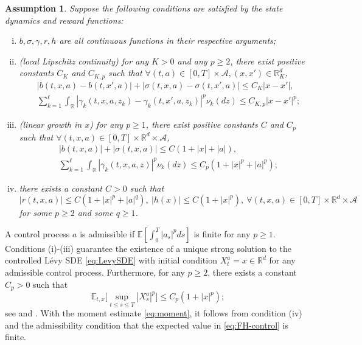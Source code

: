 \documentclass[11pt]{article}
\newtheorem{assumption}{Assumption}
\newcommand{\1}{\mathbbm{1}}
\begin{document}
\begin{assumption}\label{assump:SDE}
Suppose the following conditions are satisfied by the state dynamics and reward functions:
\begin{enumerate}[(i)]
	\item $b, \sigma, \gamma, r, h$ are all continuous functions in their respective arguments;
	
	\item (local Lipschitz continuity) for any $K>0$ and any $p\geq 2$, there exist positive constants $C_K$ and $C_{K,p}$ such that $\forall(t, a) \in[0, T] \times \mathcal{A}, (x,x')\in\mathbb{R}^d_K$,
	\begin{align}
		&|b(t,x,a)-b(t,x',a)|+|\sigma(t,x,a)-\sigma(t,x',a)|\le C_K|x-x'|,\\
		&\sum_{k=1}^\ell \int_{\mathbb{R}}|\gamma_k(t,x,a,z_k)-\gamma_k(t,x',a,z_k)|^p\nu_k(dz)\le C_{K,p}|x-x'|^p;
	\end{align}
	
	\item (linear growth in $x$) for any $p\geq 1$, there exist positive constants $C$ and $C_p$ such that $\forall(t, x, a) \in[0, T] \times \mathbb{R}^d \times \mathcal{A}$,
	\begin{align}
		&|b(t,x,a)|+|\sigma(t,x,a)|\le C(1+|x|+{|a|}),\\
		&\sum_{k=1}^\ell \int_{\mathbb{R}}|\gamma_k(t,x,a,z)|^p\nu_k(dz)\le C_p(1+|x|^p+{|a|^p});
	\end{align}

	\item there exists a constant $C>0$ such that
	\begin{equation}
		|r(t, x, a)| \le C\left(1+|x|^{p}+|a|^{q}\right), \ |h(x)| \le C\left(1+|x|^{p}\right),\ \forall(t, x, a) \in[0, T] \times \mathbb{R}^d \times \mathcal{A}
	\end{equation}
	for some $p\ge 2$ and some $q\ge 1$.
\end{enumerate}
\end{assumption}

A control process $a$ is admissible if $\mathbb{E}[\int_0^T|a_s|^{p} ds]$ is finite for any $p\geq 1$. Conditions (i)-(iii) guarantee the existence of a unique strong solution to the controlled L\'evy SDE \eqref{eq:LevySDE} with initial condition $X_t^a=x\in\mathbb{R}^d$ for any admissible control process. Furthermore, for any $p\ge 2$, there exists a constant $C_p>0$ such that
\begin{equation}\label{eq:moment}
	\mathbb{E}_{t,x}\Big[\sup_{t\le s\le T} |X_s^a|^{p}\Big]\le C_p(1+|x|^{p});
\end{equation}
see \cite[Theorem 3.2]{kunita2004stochastic} and \cite[Theorem 119]{rong2006theory}. With the moment estimate \eqref{eq:moment}, it follows from condition (iv) and the admissibility condition that the expected value in \eqref{eq:FH-control} is finite.
\end{document}
